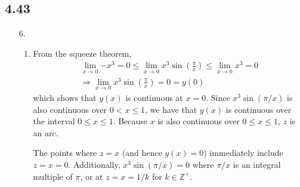 \documentclass[a4paper,12pt]{article}
\begin{document}
\subsection*{4.43}
\begin{enumerate}
    \item[6.]
        \begin{enumerate}
            \item
                From the squeeze theorem,
                \begin{gather*}
                    \lim_{x \to 0} {-x^3} = 0 \leq \lim_{x \to 0} x^3 \sin \left( \frac{\pi}{x} \right) \leq \lim_{x \to 0} x^3 = 0 \\
                    \Rightarrow \lim_{x \to 0} x^3 \sin \left( \frac{\pi}{x} \right) = 0 = y(0)
                \end{gather*}
                which shows that $y(x)$ is continuous at $x = 0$. Since $x^3 \sin(\pi/x)$ is also continuous over $0 < x \leq 1$, we have that $y(x)$ is continuous over the interval $0 \leq x \leq 1$. Because $x$ is also continuous over $0 \leq x \leq 1$, $z$ is an arc. \par
                The points where $z = x$ (and hence $y(x) = 0$) immediately include $z = x = 0$. Additionally, $x^3 \sin(\pi/x) = 0$ where $\pi/x$ is an integral multiple of $\pi$, or at $z = x = 1/k$ for $k \in \mathbb{Z}^+$.


\end{enumerate}
\end{enumerate}
\end{document}
